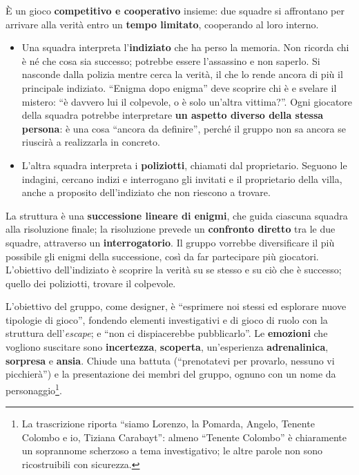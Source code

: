 È un gioco \textbf{competitivo e cooperativo} insieme: due squadre si affrontano per
arrivare alla verità entro un \textbf{tempo limitato}, cooperando al loro interno.
\begin{itemize}
  \item Una squadra interpreta l'\textbf{indiziato} che ha perso la memoria. Non ricorda
        chi è né che cosa sia successo; potrebbe essere l'assassino e non saperlo. Si
        nasconde dalla polizia mentre cerca la verità, il che lo rende ancora di più il
        principale indiziato. ``Enigma dopo enigma'' deve scoprire chi è e svelare il
        mistero: ``è davvero lui il colpevole, o è solo un'altra vittima?''. Ogni
        giocatore della squadra potrebbe interpretare \textbf{un aspetto diverso della
        stessa persona}: è una cosa ``ancora da definire'', perché il gruppo non sa
        ancora se riuscirà a realizzarla in concreto.
  \item L'altra squadra interpreta i \textbf{poliziotti}, chiamati dal proprietario.
        Seguono le indagini, cercano indizi e interrogano gli invitati e il
        proprietario della villa, anche a proposito dell'indiziato che non riescono a
        trovare.
\end{itemize}

La struttura è una \textbf{successione lineare di enigmi}, che guida ciascuna squadra
alla risoluzione finale; la risoluzione prevede un \textbf{confronto diretto} tra le due
squadre, attraverso un \textbf{interrogatorio}. Il gruppo vorrebbe diversificare il più
possibile gli enigmi della successione, così da far partecipare più giocatori.
L'obiettivo dell'indiziato è scoprire la verità su se stesso e su ciò che è successo;
quello dei poliziotti, trovare il colpevole.

L'obiettivo del gruppo, come designer, è ``esprimere noi stessi ed esplorare nuove
tipologie di gioco'', fondendo elementi investigativi e di gioco di ruolo con la
struttura dell'\emph{escape}; e ``non ci dispiacerebbe pubblicarlo''. Le
\textbf{emozioni} che vogliono suscitare sono \textbf{incertezza}, \textbf{scoperta},
un'esperienza \textbf{adrenalinica}, \textbf{sorpresa} e \textbf{ansia}. Chiude una
battuta (``prenotatevi per provarlo, nessuno vi picchierà'') e la presentazione dei
membri del gruppo, ognuno con un nome da personaggio\footnote{La trascrizione riporta
``siamo Lorenzo, la Pomarda, Angelo, Tenente Colombo e io, Tiziana Carabayt'': almeno
``Tenente Colombo'' è chiaramente un soprannome scherzoso a tema investigativo; le
altre parole non sono ricostruibili con sicurezza.}.

